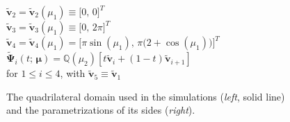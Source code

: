 \documentclass[12pt, a4paper, twoside, openright]{report}
\numberwithin{equation}{chapter}
\theoremstyle{theorem}
\theoremstyle{definition}
\theoremstyle{remark}
\theoremstyle{proposition}
\numberwithin{figure}{chapter}
\newcommand{\wt}[1]{\widetilde{#1}}
\newcommand{\bg}[1]{\boldsymbol{#1}}
\begin{document}
\begin{figure}[b!]
\begin{minipage}{0.5\textwidth}
				$\wt{\bg{v}}_2 = \wt{\bg{v}}_2(\mu_1) \equiv \big[ 0, \, 0 \big]^T$ \\[0.3cm]
				$\wt{\bg{v}}_3 = \wt{\bg{v}}_3(\mu_1) \equiv \big[ 0, \, 2 \pi \big]^T$ \\[0.3cm]
				$\wt{\bg{v}}_4 = \wt{\bg{v}}_4(\mu_1) = \big[ \pi \sin(\mu_1), \, \pi \big( 2 + \cos(\mu_1) \big) \big]^T$ \\[0.3cm]
				$\wt{\bg{\Psi}}_i(t; \, \bg{\mu}) = \mathbb{Q}(\mu_2) \left[ t \wt{\bg{v}}_i + (1-t) \wt{\bg{v}}_{i+1} \right]$ \\
				\hspace*{0.5cm} for $1 \leq i \leq 4$, with $\wt{\bg{v}}_5 \equiv \wt{\bg{v}}_1$
			\end{minipage}
			
			\vspace*{0.3cm}
			
			\caption{The quadrilateral domain used in the simulations (\emph{left}, solid line) and the parametrizations of its sides (\emph{right}).}
			\label{fig:quadrilateral-domain}
		

\end{figure}
\end{document}
